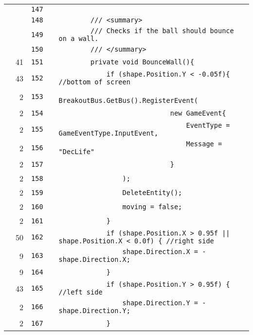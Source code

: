 \documentclass[a4paper,landscape,10pt]{article}
\begin{document}
\begin{longtable}[l]{lrrll}
\cellcolor{gray} &  & \verb~147~ & & \verb~~\\
\cellcolor{gray} &  & \verb~148~ & & \verb~        /// <summary>~\\
\cellcolor{gray} &  & \verb~149~ & & \verb~        /// Checks if the ball should bounce on a wall.~\\
\cellcolor{gray} &  & \verb~150~ & & \verb~        /// </summary>~\\
\cellcolor{green} & 41 & \verb~151~ & & \verb~        private void BounceWall(){~\\
\cellcolor{green} & 43 & \verb~152~ & & \verb~            if (shape.Position.Y < -0.05f){ //bottom of screen~\\
\cellcolor{green} & 2 & \verb~153~ & & \verb~                BreakoutBus.GetBus().RegisterEvent(~\\
\cellcolor{green} & 2 & \verb~154~ & & \verb~                            new GameEvent{~\\
\cellcolor{green} & 2 & \verb~155~ & & \verb~                                EventType = GameEventType.InputEvent,~\\
\cellcolor{green} & 2 & \verb~156~ & & \verb~                                Message = "DecLife"~\\
\cellcolor{green} & 2 & \verb~157~ & & \verb~                            }~\\
\cellcolor{green} & 2 & \verb~158~ & & \verb~                );~\\
\cellcolor{green} & 2 & \verb~159~ & & \verb~                DeleteEntity();~\\
\cellcolor{green} & 2 & \verb~160~ & & \verb~                moving = false;~\\
\cellcolor{green} & 2 & \verb~161~ & & \verb~            }~\\
\cellcolor{green} & 50 & \verb~162~ & & \verb~            if (shape.Position.X > 0.95f || shape.Position.X < 0.0f) { //right side~\\
\cellcolor{green} & 9 & \verb~163~ & & \verb~                shape.Direction.X = -shape.Direction.X;~\\
\cellcolor{green} & 9 & \verb~164~ & & \verb~            }~\\
\cellcolor{green} & 43 & \verb~165~ & & \verb~            if (shape.Position.Y > 0.95f) { //left side~\\
\cellcolor{green} & 2 & \verb~166~ & & \verb~                shape.Direction.Y = -shape.Direction.Y;~\\
\cellcolor{green} & 2 & \verb~167~ & & \verb~            }~\\

\end{longtable}
\end{document}
